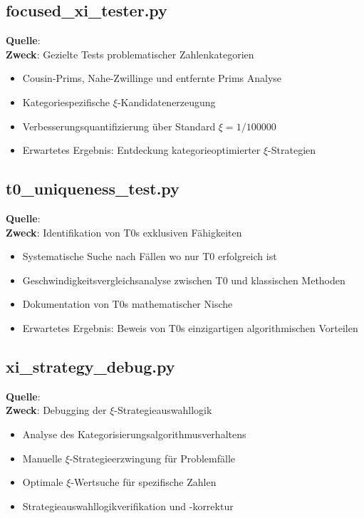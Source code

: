 	\subsection{focused\_xi\_tester.py}
	\textbf{Quelle}: \\
	\textbf{Zweck}: Gezielte Tests problematischer Zahlenkategorien
	\begin{itemize}
		\item Cousin-Prims, Nahe-Zwillinge und entfernte Prims Analyse
		\item Kategoriespezifische $\xi$-Kandidatenerzeugung
		\item Verbesserungsquantifizierung über Standard $\xi = 1/100000$
		\item Erwartetes Ergebnis: Entdeckung kategorieoptimierter $\xi$-Strategien
	\end{itemize}
	
	\subsection{t0\_uniqueness\_test.py}
	\textbf{Quelle}: \\
	\textbf{Zweck}: Identifikation von T0s exklusiven Fähigkeiten
	\begin{itemize}
		\item Systematische Suche nach Fällen wo nur T0 erfolgreich ist
		\item Geschwindigkeitsvergleichsanalyse zwischen T0 und klassischen Methoden
		\item Dokumentation von T0s mathematischer Nische
		\item Erwartetes Ergebnis: Beweis von T0s einzigartigen algorithmischen Vorteilen
	\end{itemize}
	
	\subsection{xi\_strategy\_debug.py}
	\textbf{Quelle}: \\
	\textbf{Zweck}: Debugging der $\xi$-Strategieauswahllogik
	\begin{itemize}
		\item Analyse des Kategorisierungsalgorithmusverhaltens
		\item Manuelle $\xi$-Strategieerzwingung für Problemfälle
		\item Optimale $\xi$-Wertsuche für spezifische Zahlen
		\item Strategieauswahllogikverifikation und -korrektur
	\end{itemize}
	
